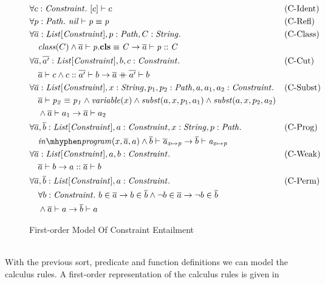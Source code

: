 \begin{figure}[h]
\begin{align*}
&\forall c: \Constr.\ \entails{[c]}{c} && \text{(C-Ident)} \\
&\forall p: \Path.\ \entails{\nil}{\pathEq{p}{p}} && \text{(C-Refl)} \\
&\forall \ovl{a}: \Constrs, p: \Path, C: \String.&& \text{(C-Class)} \\
&\quad \mIt{class}(C) \land \entails{\ovl{a}}{\instBy{p}{C}}
       \rightarrow \entails{\ovl{a}}{\instOf{p}{C}} \\
&\forall \ovl{a}, \ovl{a'}: \Constrs, b, c: \Constr. && \text{(C-Cut)} \\
&\quad \entails{\ovl a}{c} \land \entails{c :: \ovl{a'}}{b}
       \rightarrow \entails{\ovl a \conc \ovl{a'}}{b}\\
&\forall \ovl a: \Constrs, x: \String, p_1, p_2: \Path, a, a_1, a_2: \Constr. && \text{(C-Subst)} \\
&\quad \entails{\ovl a}{\pathEq{p_2}{p_1}} \land \mIt{variable}(x)
         \land \mIt{subst}(a, x, p_1, a_1) \land \mIt{subst}(a, x, p_2, a_2)\\
&\quad   \land \entails{\ovl a}{a_1}
       \rightarrow \entails{\ovl a}{a_2} \\
&\forall \ovl a, \ovl b: \Constrs, a: \Constr, x: \String, p: \Path. && \text{(C-Prog)} \\
&\quad \inprog(x, \ovl a, a) \land \entails{\ovl b}{\subst{\ovl a}{x}{p}}
       \rightarrow \entails{\ovl b}{\subst{a}{x}{p}} \\
&\forall \ovl a: \Constrs, a, b: \Constr. && \text{(C-Weak)} \\
&\quad \entails{\ovl a}{b}
       \rightarrow \entails{a :: \ovl a}{b}\\
&\forall \ovl a, \ovl b: \Constrs, a: \Constr. && \text{(C-Perm)} \\
&\quad \forall b: \Constr.\ 
           b \in \ovl a \rightarrow b \in \ovl b
           \land
           \neg b \in \ovl a \rightarrow \neg b \in \ovl b\\
&\quad \land \entails{\ovl a}{a}
       \rightarrow \entails{\ovl b}{a}
\end{align*}
\caption{First-order Model Of Constraint Entailment}
\label{fig:axioms-naive}
\end{figure}\\
With the previous sort, predicate and function definitions
we can model the calculus rules.
A first-order representation of the calculus rules is given in 

